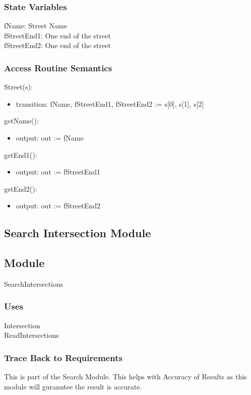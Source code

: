 \documentclass[12pt]{article}
\begin{document}
\subsubsection*{State Variables}
fName: Street Name\\
fStreetEnd1: One end of the street\\
fStreetEnd2: One end of the street

\newpage
\subsubsection*{Access Routine Semantics}
\noindent Street(s):
\begin{itemize}
    \item transition: fName, fStreetEnd1, fStreetEnd2 := s[0], s[1], s[2]
\end{itemize}

\noindent getName():
\begin{itemize}
    \item output: out := fName
\end{itemize}

\noindent getEnd1():
\begin{itemize}
    \item output: out := fStreetEnd1
\end{itemize}

\noindent getEnd2():
\begin{itemize}
    \item output: out := fStreetEnd2
\end{itemize}

\newpage
\subsection{Search Intersection Module}
\subsection*{Module}
SearchIntersections

\subsubsection*{Uses}
Intersection\\
ReadIntersections

\subsubsection*{Trace Back to Requirements}
This is part of the Search Module. This helps with Accuracy of Results as this module will guranntee the result is accurate.
\end{document}
